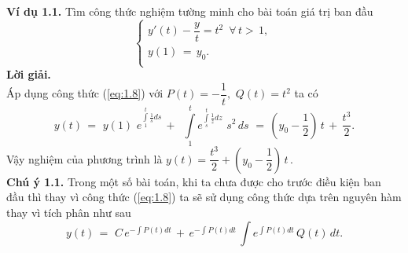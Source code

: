 \textbf{Ví dụ 1.1.} Tìm công thức nghiệm tường minh cho bài toán giá trị ban đầu
\[\left\{ \begin{array}{l}
	 y'(t)-\dfrac{y}{t}={{t}^{2}}\,\,\,\forall \,t>\,1,\, \\ 
	 y(1)\,=\,{{y}_{0}}. \\ 
\end{array} \right.\]
\textbf{Lời giải.}\\
Áp dụng công thức (\ref{eq:1.8}) với $P\left( t \right)=-\dfrac{1}{t},\,\,Q(t)={{t}^{2}}$ ta có \[y(t)\,=\,\,y(1)\,\,{{e}^{\int\limits_{1}^{t}{\frac{1}{s}ds}}}\,+\,\,\,\int\limits_{1}^{t}{{{e}^{\int\limits_{s}^{t}{\frac{1}{z}dz}}}}\,\,{{s}^{2}}\,ds\,\,=\,\left( {{y}_{0}}-\dfrac{1}{2} \right)\,t\,+\,\dfrac{{{t}^{3}}}{2}.\]
Vậy nghiệm của phương trình là $y(t)=\dfrac{{{t}^{3}}}{2}+\left( {{y}_{0}}-\dfrac{1}{2} \right)\,t\,.$\\
\textbf{Chú ý 1.1.
} Trong một số bài toán, khi ta chưa được cho trước điều kiện ban đầu thì thay vì công thức (\ref{eq:1.8}) ta sẽ sử dụng công thức dựa trên nguyên hàm thay vì tích phân như sau
\begin{equation}
	y(t)\,=\,\,C\,{{e}^{-\int{P(t)dt}}}\,+\,{{e}^{-\int{P(t)dt}}}\,\int{{{e}^{\int{P(t)dt}}}}\,Q(t)\,dt.
\label{eq:1.9}
\end{equation}
